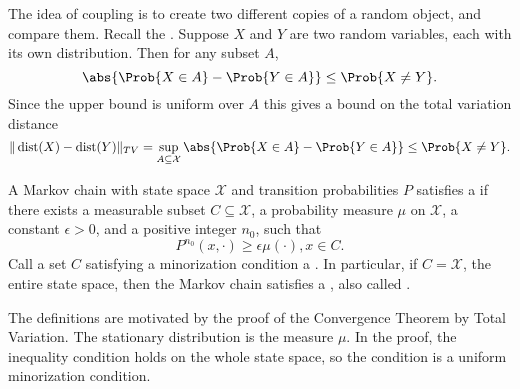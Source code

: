 \documentclass[12pt]{article}
\begin{document}
The idea of coupling is to create two different copies of a random
object, and compare them.  Recall the .%
Suppose \( X \) and \( Y \) are two random variables, each with its own
distribution.  Then for any subset \( A \), %
\[
    \abs{\Prob{X \in A} - \Prob{Y \in A}} \le \Prob{X \ne Y}.
\] Since the upper bound is uniform over \( A \) this gives a bound on
the total variation distance
\begin{equation}
    \label{eqn:convergencestationary:tvbound} \|
    \operatorname{dist}
    (X) -
    \operatorname{dist}
    (Y) \|_{TV} = \sup_{A \subseteq \mathcal{X}} \abs{\Prob{X \in A} -
    \Prob{Y \in A}} \le \Prob{X \ne Y}.
\end{equation}
\begin{definition}
    A Markov chain with state space \( \mathcal{X} \) and transition
    probabilities \( P \) satisfies a %
    if there exists a measurable subset \( C \subseteq \mathcal{X} \), a
    probability measure \( \mu \) on \( \mathcal{X} \), a constant \(
    \epsilon > 0 \), and a positive integer \( n_0 \), such that
    \[
        P^{n_0} (x, \cdot) \ge \epsilon \mu(\cdot), x \in C.
    \] Call a set \( C \) satisfying a minorization condition a .%
    In particular, if \( C = \mathcal{X} \), the entire state space,
    then the Markov chain satisfies a ,%
    also called .%
\end{definition}

\begin{remark}
    The definitions are motivated by the proof of the Convergence
    Theorem by Total Variation.  The stationary distribution is the
    measure \( \mu \).  In the proof, the inequality condition holds on
    the whole state space, so the condition is a uniform minorization
    condition.
\end{remark}
\end{document}

